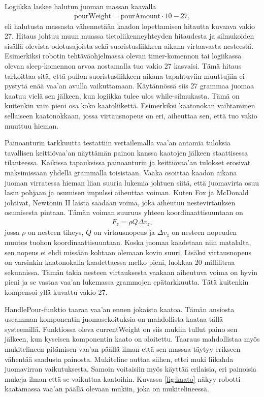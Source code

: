 Logiikka laskee halutun juoman massan kaavalla
\begin{align}
    \mathrm{pourWeight} = \mathrm{pourAmount} \cdot 10 - 27 \mathrm{,}
\end{align}
eli halutusta massasta vähennetään kaadon lopettamisen hitautta kuvaava vakio 27. Hitaus johtuu muun muassa tietoliikenneyhteyden hitaudesta ja silmukoiden sisällä olevista odotusajoista sekä suoristusliikkeen aikana virtaavasta nesteestä. Esimerkiksi robotin tehtäväohjelmassa olevan timer-komennon tai logiikassa olevan sleep-komennon arvoa nostamalla tuo vakio 27 kasvaisi. Tämä hitaus tarkoittaa sitä, että pullon suoristusliikkeen aikana tapahtuviin muuttujiin ei pystytä enää vaa'an avulla vaikuttamaan. Käytännössä siis 27 grammaa juomaa kaatuu vielä sen jälkeen, kun logiikka tulee ulos while-silmukasta. Tämä on kuitenkin vain pieni osa koko kaatoliikettä. Esimerkiksi kaatonokan vaihtaminen sellaiseen kaatonokkaan, jossa virtausnopeus on eri, aiheuttaa sen, että tuo vakio muuttuu hieman.

Painoanturin tarkkuutta testattiin vertailemalla vaa'an antamia tuloksia tavallisen keittiövaa'an näyttämän painon kanssa kaatojen jälkeen staattisessa tilanteessa. Kaikissa tapauksissa painoanturin ja keittiövaa'an tulokset erosivat maksimissaan yhdellä grammalla toisistaan. Vaaka osoittaa kaadon aikana juoman virratessa hieman liian suuria lukemia johtuen siitä, että juomavirta osuu lasin pohjaan ja osumisen impulssi aiheuttaa voiman. Kuten Fox ja McDonald \cite[s.197-198]{Fox2011} johtivat, Newtonin II laista saadaan voima, joka aiheutuu nestevirtauksen osumisesta pintaan. Tämän voiman suuruus yhteen koordinaattisuuntaan on
\begin{align}
    F_z = \rho Q \Delta v_z \mathrm{,}
\end{align}
jossa $\rho$ on nesteen tiheys, $Q$ on virtausnopeus ja $\Delta v_z$ on nesteen nopeuden muutos tuohon koordinaattisuuntaan. Koska juomaa kaadetaan niin matalalta, sen nopeus ei ehdi missään kohtaan olemaan kovin suuri. Lisäksi virtausnopeus on varsinkin kaatonokalla kaadettaessa melko pieni, luokkaa 20 millilitraa sekunnissa. Tämän takia nesteen virtauksesta vaakaan aiheutuva
voima on hyvin pieni ja se vastaa vaa'an lukemassa grammojen epätarkkuutta. Tätä kuitenkin kompensoi yllä kuvattu vakio 27.

HandlePour-funktio taaraa vaa'an ennen jokaista kaatoa. Tämän ansiosta useamman komponentin juomasekoituksia on mahdollista kaataa tällä systeemillä. Funktiossa oleva currentWeight on siis mukiin tullut paino sen jälkeen, kun kyseisen komponentin kaato on aloitettu. Taaraus mahdollistaa myös mukitelineen pitämisen vaa'an päällä ilman että sen massaa täytyy erikseen vähentää saadusta painosta. Mukiteline auttaa siihen, ettei muki liikahda juomavirran vaikutuksesta. Samoin voitaisiin myös käyttää erilaisia, eri painoisia mukeja ilman että se vaikuttaa kaatoihin. Kuvassa \ref{fig:kaato} näkyy robotti kaatamassa vaa'an päällä olevaan mukiin, joka on mukitelineessä.

